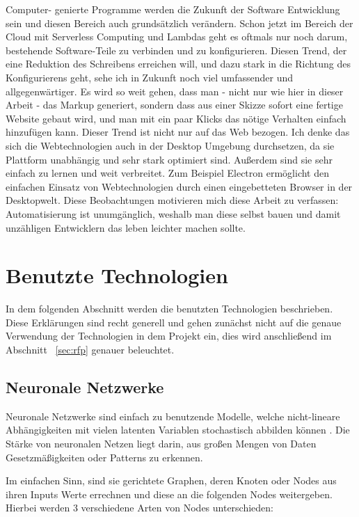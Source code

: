 \documentclass[pdftex,a4paper,halfparskip, article]{scrartcl}
\begin{document}
Computer- genierte Programme werden die Zukunft der Software Entwicklung sein und diesen Bereich auch grundsätzlich verändern. Schon jetzt im Bereich der Cloud mit Serverless Computing und Lambdas geht es oftmals nur noch darum, bestehende Software-Teile zu verbinden und zu konfigurieren. Diesen Trend, der eine Reduktion des Schreibens erreichen will, und dazu stark in die Richtung des Konfigurierens geht, sehe ich in Zukunft noch viel umfassender und allgegenwärtiger. Es wird so weit gehen, dass man - nicht nur wie hier in dieser Arbeit - das Markup generiert, sondern dass aus einer Skizze sofort eine fertige Website gebaut wird, und man mit ein paar Klicks das nötige Verhalten einfach hinzufügen kann. 
Dieser Trend ist nicht nur auf das Web bezogen. Ich denke das sich die Webtechnologien auch in der Desktop Umgebung durchsetzen,  da sie Plattform unabhängig und sehr stark optimiert sind. Außerdem sind sie sehr einfach zu lernen und weit verbreitet. Zum Beispiel Electron \cite{electron} ermöglicht den einfachen Einsatz von Webtechnologien durch einen eingebetteten Browser in der Desktopwelt.
Diese Beobachtungen motivieren mich diese Arbeit zu verfassen: Automatisierung ist unumgänglich, weshalb man diese selbst bauen und damit unzähligen Entwicklern das leben leichter machen sollte.

\newpage
\section{Benutzte Technologien}


In dem folgenden Abschnitt werden die benutzten Technologien beschrieben. Diese Erklärungen sind recht generell und gehen zunächst nicht auf die genaue Verwendung der Technologien in dem Projekt ein, dies wird anschließend im Abschnitt ~\ref{sec:rfp} genauer beleuchtet.

\subsection{Neuronale Netzwerke}
Neuronale Netzwerke sind einfach zu benutzende Modelle, welche nicht-lineare Abhängigkeiten mit vielen latenten Variablen stochastisch abbilden können \cite{nnWebsite}. Die Stärke von neuronalen Netzen liegt darin, aus großen Mengen von Daten Gesetzmäßigkeiten oder Patterns zu erkennen. 

Im einfachen Sinn, sind sie gerichtete Graphen, deren Knoten oder Nodes aus ihren Inputs Werte errechnen und diese an die folgenden Nodes weitergeben. Hierbei werden 3 verschiedene Arten von Nodes unterschieden:
\end{document}
